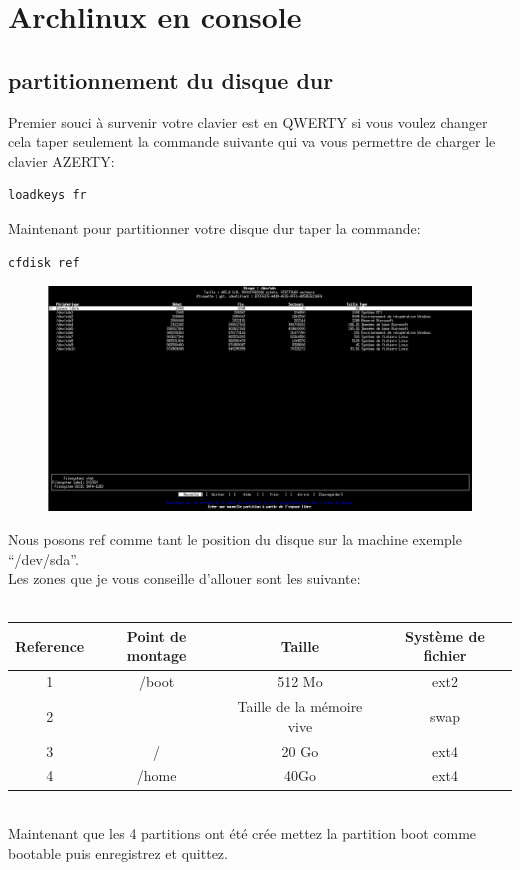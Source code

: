\documentclass[a4paper]{book}
\begin{document}
\part{Archlinux en console}
\chapter{partitionnement  du disque dur}
Premier souci à survenir votre clavier est en QWERTY si vous voulez changer
cela taper seulement la commande suivante qui va vous permettre de charger le
clavier AZERTY:
\begin{verbatim}
loadkeys fr
\end{verbatim}
Maintenant pour partitionner votre disque dur taper la commande:
\begin{verbatim}
cfdisk ref
\end{verbatim}
\begin{figure}[h]
  \includegraphics[width=13cm]{images/cfdisk}
\end{figure}
Nous posons ref comme tant le position du disque sur la machine exemple
``/dev/sda''.\\
Les zones que je vous conseille d'allouer sont les suivante:\\ \\
\begin{tabular}{|c|c|c|c|}
  Reference & Point de montage & Taille & Système de fichier\\
  \hline
  1 & /boot & 512 Mo & ext2 \\
  \hline
  2 & & Taille de la mémoire vive & swap \\
  \hline
  3 & / & 20 Go & ext4\\
  \hline
  4 & /home & 40Go & ext4
\end{tabular}
\\Maintenant que les 4 partitions ont été crée mettez la partition boot comme
bootable puis enregistrez et quittez.\\
\end{document}

